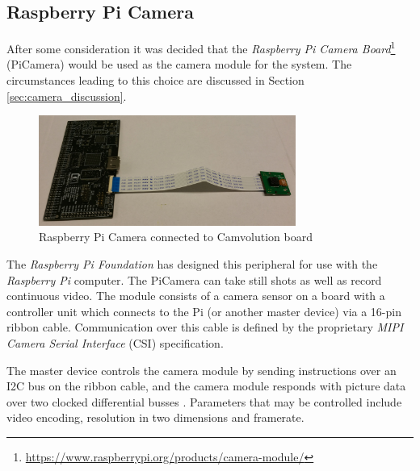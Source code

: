 \subsection{Raspberry Pi Camera}
After some consideration it was decided that the \textit{Raspberry Pi Camera Board}\footnote{\url{https://www.raspberrypi.org/products/camera-module/}} (PiCamera) would be used as the camera module for the system.
The circumstances leading to this choice are discussed in Section \ref{sec:camera_discussion}.

\begin{figure}[h]
    \centering
    \includegraphics[width=0.75\textwidth]{img/picamera}
    \caption{Raspberry Pi Camera connected to Camvolution board}
\end{figure}

The \textit{Raspberry Pi Foundation} has designed this peripheral for use with the \textit{Raspberry Pi} computer.
The PiCamera can take still shots as well as record continuous video.
The module consists of a camera sensor on a board with a controller unit which connects to the Pi (or another master device) via a 16-pin ribbon cable.
Communication over this cable is defined by the proprietary \textit{MIPI Camera Serial Interface} (CSI) specification.

The master device controls the camera module by sending instructions over an I2C bus on the ribbon cable,
and the camera module responds with picture data over two clocked differential busses \cite{picam-pinout}.
Parameters that may be controlled include video encoding, resolution in two dimensions and framerate.

